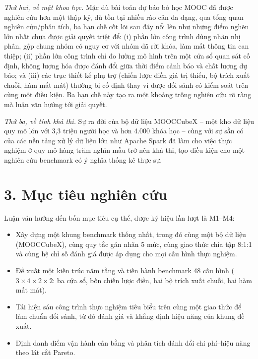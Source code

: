 \textit{Thứ hai, về mặt khoa học.} Mặc dù bài toán dự báo bỏ học MOOC đã được nghiên cứu hơn một thập kỷ, dù tồn tại nhiều rào cản đa dạng, qua tổng quan nghiên cứu/phân tích, ba hạn chế cốt lõi sau đây nổi lên như những điểm nghẽn lớn nhất chưa được giải quyết triệt để: (i) phần lớn công trình dùng nhãn nhị phân, gộp chung nhóm có nguy cơ với nhóm đã rời khóa, làm mất thông tin can thiệp; (ii) phần lớn công trình chỉ đo lường mô hình trên một cửa sổ quan sát cố định, không lượng hóa được đánh đổi giữa thời điểm cảnh báo và chất lượng dự báo; và (iii) các trục thiết kế phụ trợ (chiến lược điền giá trị thiếu, bộ trích xuất chuỗi, hàm mất mát) thường bị cố định thay vì được đối sánh có kiểm soát trên cùng một điều kiện. Ba hạn chế này tạo ra một khoảng trống nghiên cứu rõ ràng mà luận văn hướng tới giải quyết.

\textit{Thứ ba, về tính khả thi.} Sự ra đời của bộ dữ liệu MOOCCubeX \cite{Yu2021} -- một kho dữ liệu quy mô lớn với 3,3 triệu người học và hơn 4.000 khóa học -- cùng với sự sẵn có của các nền tảng xử lý dữ liệu lớn như Apache Spark \cite{Zaharia2016} đã làm cho việc thực nghiệm ở quy mô hàng trăm nghìn mẫu trở nên khả thi, tạo điều kiện cho một nghiên cứu benchmark có ý nghĩa thống kê thực sự.

\section*{3. Mục tiêu nghiên cứu}

Luận văn hướng đến bốn mục tiêu cụ thể, được ký hiệu lần lượt là M1--M4:

\begin{itemize}[leftmargin=1.2cm,topsep=3pt]
  \item[\textbf{M1.}] Xây dựng một khung benchmark thống nhất, trong đó cùng một bộ dữ liệu (MOOCCubeX), cùng quy tắc gán nhãn 5 mức, cùng giao thức chia tập 8:1:1 và cùng hệ chỉ số đánh giá được áp dụng cho mọi cấu hình thực nghiệm.
  \item[\textbf{M2.}] Đề xuất một kiến trúc năm tầng và tiến hành benchmark 48 cấu hình ($3 \times 4 \times 2 \times 2$: ba cửa sổ, bốn chiến lược điền, hai bộ trích xuất chuỗi, hai hàm mất mát).
  \item[\textbf{M3.}] Tái hiện sáu công trình thực nghiệm tiêu biểu trên cùng một giao thức để làm chuẩn đối sánh, từ đó đánh giá và khẳng định hiệu năng của khung đề xuất.
  \item[\textbf{M4.}] Định danh điểm vận hành cân bằng và phân tích đánh đổi chi phí--hiệu năng theo lát cắt Pareto.
\end{itemize}

